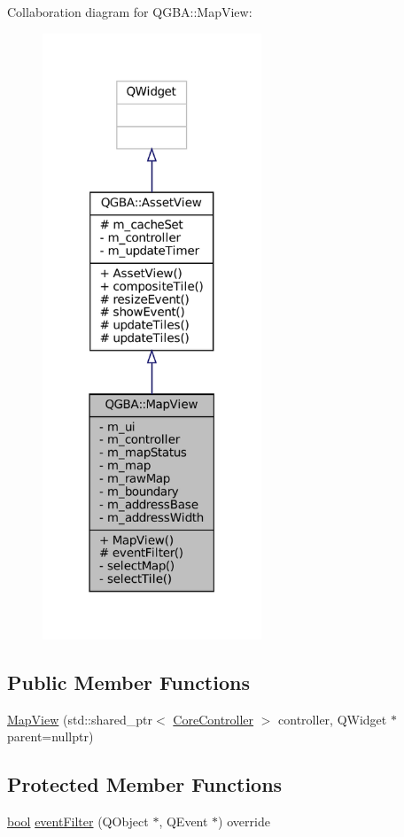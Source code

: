 Collaboration diagram for Q\+G\+BA\+:\+:Map\+View\+:
\nopagebreak
\begin{figure}[H]
\begin{center}
\leavevmode
\includegraphics[width=185pt]{class_q_g_b_a_1_1_map_view__coll__graph}
\end{center}
\end{figure}
\subsection*{Public Member Functions}
\begin{DoxyCompactItemize}
\item 
\mbox{\hyperlink{class_q_g_b_a_1_1_map_view_a6a22b0a4093d08c0ddf2c57dd028bfe7}{Map\+View}} (std\+::shared\+\_\+ptr$<$ \mbox{\hyperlink{class_q_g_b_a_1_1_core_controller}{Core\+Controller}} $>$ controller, Q\+Widget $\ast$parent=nullptr)
\end{DoxyCompactItemize}
\subsection*{Protected Member Functions}
\begin{DoxyCompactItemize}
\item 
\mbox{\hyperlink{libretro_8h_a4a26dcae73fb7e1528214a068aca317e}{bool}} \mbox{\hyperlink{class_q_g_b_a_1_1_map_view_a6292ffd1dfcd0160d05d3872fcb3b04b}{event\+Filter}} (Q\+Object $\ast$, Q\+Event $\ast$) override
\end{DoxyCompactItemize}
